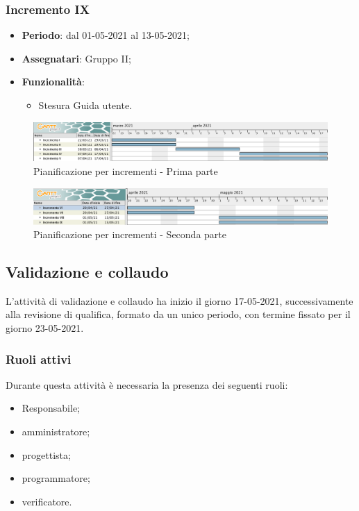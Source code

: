 \subsubsection{Incremento IX}
\begin{itemize}
	\item \textbf{Periodo}: dal 01-05-2021 al 13-05-2021;
	\item \textbf{Assegnatari}: Gruppo II;
	\item \textbf{Funzionalità}:
	\begin{itemize}
		\item Stesura Guida utente.
	\end{itemize}
\end{itemize}

\newpage

\begin{landscape}
	\begin{figure}[h!]
		\includegraphics[width=24cm]{images/4_Incrementi_1.png}
		\caption{Pianificazione per incrementi - Prima parte}
	\end{figure}

    \begin{figure}[h!]
        \includegraphics[width=24cm]{images/4_Incrementi_2.png}
        \caption{Pianificazione per incrementi - Seconda parte}
    \end{figure}
\end{landscape}

\newpage

\subsection{Validazione e collaudo}
L'attività di validazione e collaudo ha inizio il giorno 17-05-2021, successivamente alla revisione di qualifica, formato da un unico periodo, con termine fissato per il giorno 23-05-2021.

\subsubsection{Ruoli attivi}
Durante questa attività è necessaria la presenza dei seguenti ruoli:
\begin{itemize}
	\item Responsabile;
	\item amministratore;
	\item progettista;
	\item programmatore;
	\item verificatore.
\end{itemize}
